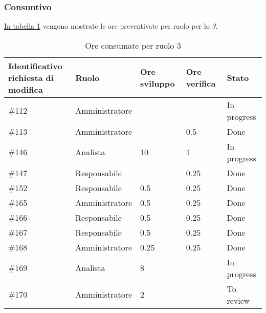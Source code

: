 \subsubsection{Consuntivo}

\hyperref[tab:sprint3_ore_consumate]{In tabella \ref{tab:sprint3_ore_consumate}} vengono mostrate le ore preventivate per ruolo per lo \textit{ 3}.

\begin{table}[H]
    \centering
    \begin{tabular}{| l | l | l | l | l |}
        \hline
            \makecell{\textbf{Identificativo} \\ \textbf{richiesta di modifica}} &
            \textbf{Ruolo} & 
            \textbf{Ore sviluppo} &
            \textbf{Ore verifica} & 
            \textbf{Stato}\\ 
        \hline
            \#112 & Amministratore &  & & In progress\\
        \hline
            \#113 & Amministratore &  & 0.5 & Done\\
        \hline
            \#146 & Analista & 10 & 1 & In progress\\
        \hline
            \#147 & Responsabile &  & 0.25 & Done \\
        \hline
            \#152 & Responsabile & 0.5 & 0.25 & Done\\
        \hline
            \#165 & Amministratore & 0.5 & 0.25 & Done\\
        \hline
            \#166 & Responsabile & 0.5 & 0.25 & Done\\
        \hline
            \#167 & Responsabile & 0.5 & 0.25 & Done\\
        \hline
            \#168 & Amministratore & 0.25 & 0.25 & Done\\
        \hline
            \#169 & Analista & 8 & & In progress\\
        \hline
            \#170 & Amministratore & 2 & & To review\\
        \hline
    \end{tabular}
    \caption{Ore consumate per ruolo  3}
    \label{tab:sprint3_ore_consumate} 
\end{table}